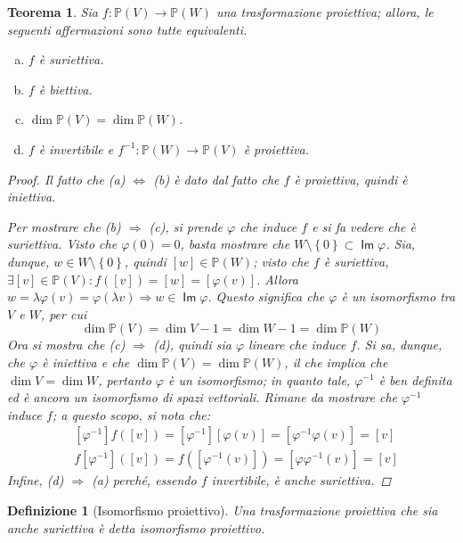 \documentclass[11pt, a4paper]{scrartcl}
\theoremstyle{style1}
\newtheorem{teorema}{Teorema}[section]
\newtheorem{definizione}{Definizione}[section]
\numberwithin{equation}{subsection}
\renewcommand{\operatorname}[1]{\mathop{\mathrm{\textsf{#1}}}}
\begin{document}
\begin{teorema}
	Sia $f:\mathbb{P}(V)\to \mathbb{P}(W)$ una trasformazione proiettiva; allora, le seguenti affermazioni sono tutte equivalenti.
	\begin{enumerate}[(a).]
		\item $f$ \`e suriettiva.
		\item $f$ \`e biettiva.
		\item $\dim \mathbb{P}(V) = \dim\mathbb{P}(W)$.
		\item $f$ \`e invertibile e $f^{-1} : \mathbb{P}(W) \to \mathbb{P}(V)$ \`e proiettiva.
	\end{enumerate}
	\begin{proof}
		Il fatto che (a) $\iff$ (b) \`e dato dal fatto che $f$ \`e proiettiva, quindi \`e iniettiva.

Per mostrare che (b) $\Rightarrow $ (c), si prende $\varphi $ che induce $f$ e si fa vedere che \`e suriettiva.
Visto che $\varphi (0) = 0$, basta mostrare che $W\setminus \left\{ 0 \right\} \subset \operatorname{Im} \varphi $.
Sia, dunque, $w \in W \setminus \left\{ 0 \right\} $, quindi $[w] \in \mathbb{P}(W)$; visto che $f$ \`e suriettiva, $\exists [v] \in \mathbb{P}(V) : f([v]) = [w] = [\varphi (v)]$. 
Allora $w = \lambda \varphi (v) = \varphi (\lambda v) \Rightarrow w \in \operatorname{Im} \varphi $.
Questo significa che $\varphi $ \`e un isomorfismo tra $V$ e $W$, per cui
\[
\dim \mathbb{P}(V) = \dim V - 1 = \dim W -1 = \dim \mathbb{P}(W)
\] 
Ora si mostra che (c) $\Rightarrow $ (d), quindi sia $\varphi $ lineare che induce $f$. 
Si sa, dunque, che $\varphi $ \`e iniettiva e che $\dim \mathbb{P}(V) = \dim \mathbb{P}(W)$, il che implica che $\dim V = \dim W$, pertanto $\varphi $ \`e un isomorfismo; in quanto tale, $\varphi ^{-1} $ \`e ben definita ed \`e ancora un isomorfismo di spazi vettoriali.
Rimane da mostrare che $\varphi ^{-1} $ induce $f$; a questo scopo, si nota che:
\[
\begin{split}
	&[\varphi ^{-1} ] f([v]) = [\varphi ^{-1} ][\varphi (v)] = [\varphi ^{-1} \varphi (v)] = [v]\\
	&f[\varphi ^{-1} ]([v]) = f \left([\varphi ^{-1} (v)]\right) =[\varphi \varphi ^{-1} (v)] = [v]
\end{split}
\] 
Infine, (d) $\Rightarrow $ (a) perch\'e, essendo $f$ invertibile, \`e anche suriettiva.
	\end{proof}
\end{teorema}
\begin{definizione}
	[Isomorfismo proiettivo]
	Una trasformazione proiettiva che sia anche suriettiva \`e detta \textit{isomorfismo proiettivo}.
\end{definizione}
\end{document}
